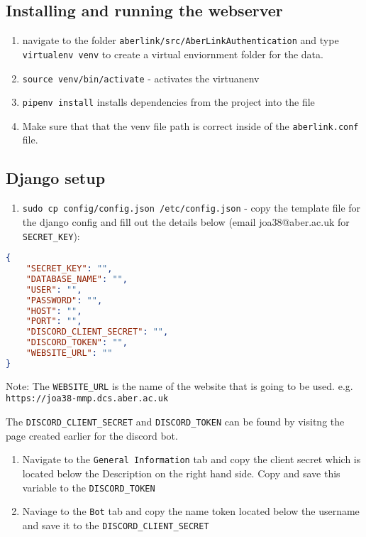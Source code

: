 \subsection{Installing and running the
webserver}\label{installing-and-running-the-webserver}

\begin{enumerate}
\def\labelenumi{\arabic{enumi}.}
\item
  navigate to the folder \texttt{aberlink/src/AberLinkAuthentication}
  and type \texttt{virtualenv venv} to create a virtual enviornment
  folder for the data.
\item
  \texttt{source venv/bin/activate} - activates the virtuanenv
\item
  \texttt{pipenv install} installs dependencies from the project into
  the file
\item
  Make sure that that the venv file path is correct inside of the
  \texttt{aberlink.conf} file.
\end{enumerate}

\subsection{Django setup}\label{django-setup}

\begin{enumerate}
\def\labelenumi{\arabic{enumi}.}
\itemsep1pt\parskip0pt
\item
  \texttt{sudo cp config/config.json /etc/config.json} - copy the
  template file for the django config and fill out the details below
  (email joa38@aber.ac.uk for \texttt{SECRET\_KEY}):
\end{enumerate}

\begin{lstlisting}[language=json]
{
    "SECRET_KEY": "",
    "DATABASE_NAME": "",
    "USER": "",
    "PASSWORD": "",
    "HOST": "",
    "PORT": "",
    "DISCORD_CLIENT_SECRET": "",
    "DISCORD_TOKEN": "",
    "WEBSITE_URL": ""
}
\end{lstlisting}
Note: The \texttt{WEBSITE\_URL} is the name of the website that is going
to be used. e.g. \texttt{https://joa38-mmp.dcs.aber.ac.uk}

The \texttt{DISCORD\_CLIENT\_SECRET} and \texttt{DISCORD\_TOKEN} can be
found by visitng the page created earlier for the discord bot.

\begin{enumerate}
\def\labelenumi{\arabic{enumi}.}
\item
  Navigate to the \texttt{General Information} tab and copy the client
  secret which is located below the Description on the right hand side.
  Copy and save this variable to the \texttt{DISCORD\_TOKEN}
\item
  Naviage to the \texttt{Bot} tab and copy the name token located below
  the username and save it to the \texttt{DISCORD\_CLIENT\_SECRET}
\end{enumerate}

